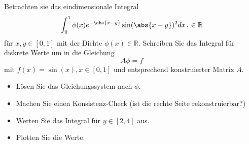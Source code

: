 \begin{aufg}[0]
Betrachten sie das eindimensionale Integral
\[
\int_0^1 \phi(x)e^{-\abs{x-y}}\sin(\abs{x-y})^2 dx\,,\, \in \mathbb{R}
\]
für $x,y \in [0,1]$ mit der Dichte $\phi(x) \in \mathbb{R}$. Schreiben Sie das Integral für diskrete Werte um in die Gleichung 
\[
 A \phi = f
\]
mit $f(x)=\sin(x),  x \in [0,1]$ und entsprechend konstruierter Matrix $A$.
\begin{itemize}
\item Lösen Sie das Gleichungssystem nach $\phi$.
\item Machen Sie einen Konsistenz-Check (ist die rechte Seite rekonstruierbar?)
\item Werten Sie das Integral für $y \in [2,4]$ aus.
\item Plotten Sie die Werte.
\end{itemize}
\end{aufg}